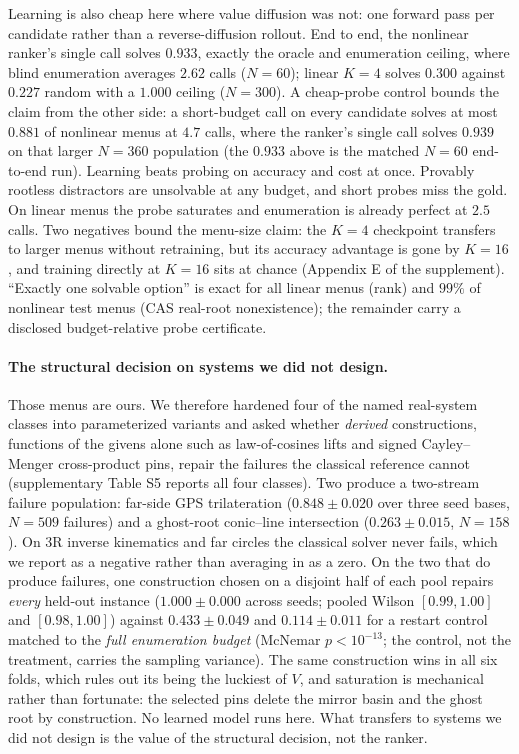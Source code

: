 \documentclass[letterpaper]{article} %
\begin{document}
Learning is also cheap here where value diffusion was not: one forward pass per candidate
rather than a reverse-diffusion rollout. End to end, the nonlinear ranker's single call solves
$0.933$, exactly the oracle and enumeration ceiling, where blind enumeration averages $2.62$
calls ($N{=}60$); linear $K{=}4$ solves $0.300$ against $0.227$ random with a $1.000$ ceiling
($N{=}300$). A cheap-probe control bounds the claim from the other side: a short-budget call on every
candidate solves at most $0.881$ of nonlinear menus at $4.7$ calls, where
the ranker's single call solves $0.939$ on that
larger $N{=}360$ population (the $0.933$ above is the matched $N{=}60$ end-to-end run). Learning beats probing on accuracy
and cost at once. Provably rootless distractors are unsolvable at any budget, and short
probes miss the gold. On linear menus the probe saturates and enumeration is already perfect at $2.5$ calls.
Two negatives bound the menu-size claim: the $K{=}4$ checkpoint transfers to larger menus
without retraining, but its accuracy advantage is gone by $K{=}16$, and training directly at
$K{=}16$ sits at chance (Appendix E of the supplement). ``Exactly one solvable option'' is exact for all linear menus (rank) and $99\%$ of nonlinear
test menus (CAS real-root nonexistence); the remainder carry a disclosed budget-relative
probe certificate.

\paragraph{The structural decision on systems we did not design.}
Those menus are ours. We therefore hardened four of the named real-system classes into
parameterized variants and asked whether \emph{derived} constructions, functions of the
givens alone such as law-of-cosines lifts and signed Cayley--Menger cross-product pins,
repair the failures the classical reference cannot (supplementary Table S5 reports
all four classes). Two produce a two-stream failure population: far-side GPS trilateration ($0.848 \pm 0.020$
over three seed bases, $N{=}509$ failures) and a ghost-root conic--line intersection
($0.263 \pm 0.015$, $N{=}158$). On 3R inverse kinematics and far circles the classical solver
never fails, which we report as a negative rather than averaging in as a zero. On the two that do produce failures, one construction chosen on a disjoint half of each pool
repairs \emph{every} held-out instance ($1.000 \pm 0.000$ across seeds; pooled Wilson
$[0.99, 1.00]$ and $[0.98, 1.00]$) against $0.433 \pm 0.049$ and $0.114 \pm 0.011$ for a
restart control matched to the \emph{full enumeration budget} (McNemar $p < 10^{-13}$; the
control, not the treatment, carries the sampling variance). The same
construction wins in all six folds, which rules out its being the luckiest of $V$, and
saturation is
mechanical rather than fortunate: the selected pins delete the mirror basin and the ghost
root by construction. No learned model runs here. What transfers to systems we did not
design is the value of the structural decision, not the ranker.
\end{document}
